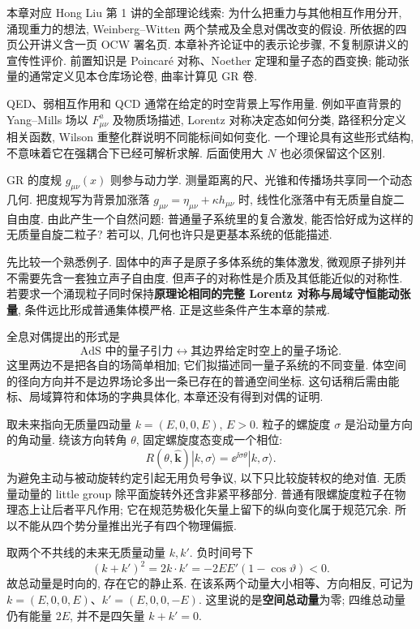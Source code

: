 \label{ch:holo-emergence-full}
本章对应 Hong Liu 第 1 讲的全部理论线索: 为什么把重力与其他相互作用分开, 涌现重力的想法, Weinberg--Witten 两个禁戒及全息对偶改变的假设. 所依据的四页公开讲义含一页 OCW 署名页. 本章补齐论证中的表示论步骤, 不复制原讲义的宣传性评价. 前置知识是 Poincaré 对称、Noether 定理和量子态的酉变换; 能动张量的通常定义见本仓库场论卷, 曲率计算见 GR 卷.

QED、弱相互作用和 QCD 通常在给定的时空背景上写作用量. 例如平直背景的 Yang--Mills 场以 $F^a_{\mu\nu}$ 及物质场描述, Lorentz 对称决定态如何分类, 路径积分定义相关函数, Wilson 重整化群说明不同能标间如何变化. 一个理论具有这些形式结构, 不意味着它在强耦合下已经可解析求解. 后面使用大 $N$ 也必须保留这个区别.

GR 的度规 $g_{\mu\nu}(x)$ 则参与动力学. 测量距离的尺、光锥和传播场共享同一个动态几何. 把度规写为背景加涨落 $g_{\mu\nu}=\eta_{\mu\nu}+\kappa h_{\mu\nu}$ 时, 线性化涨落中有无质量自旋二自由度. 由此产生一个自然问题: 普通量子系统里的复合激发, 能否恰好成为这样的无质量自旋二粒子? 若可以, 几何也许只是更基本系统的低能描述.

先比较一个熟悉例子. 固体中的声子是原子多体系统的集体激发, 微观原子排列并不需要先含一套独立声子自由度. 但声子的对称性是介质及其低能近似的对称性. 若要求一个涌现粒子同时保持\textbf{原理论相同的完整 Lorentz 对称与局域守恒能动张量}, 条件远比形成普通集体模严格. 正是这些条件产生本章的禁戒.

全息对偶提出的形式是
\[
\text{AdS 中的量子引力}
\longleftrightarrow
\text{其边界给定时空上的量子场论}.
\]
这里两边不是把各自的场简单相加; 它们拟描述同一量子系统的不同变量. 体空间的径向方向并不是边界场论多出一条已存在的普通空间坐标. 这句话稍后需由能标、局域算符和体场的字典具体化, 本章还没有得到对偶的证明.

取未来指向无质量四动量 $k=(E,0,0,E)$, $E>0$. 粒子的螺旋度 $\sigma$ 是沿动量方向的角动量. 绕该方向转角 $\theta$, 固定螺旋度态变成一个相位:
\[
R(\theta,\widehat{\mathbf k})|k,\sigma\rangle
=\ee^{\ii\sigma\theta}|k,\sigma\rangle.
\]
为避免主动与被动旋转约定引起无用负号争议, 以下只比较旋转权的绝对值. 无质量动量的 little group 除平面旋转外还含非紧平移部分. 普通有限螺旋度粒子在物理态上让后者平凡作用; 它在规范势极化矢量上留下的纵向变化属于规范冗余. 所以不能从四个势分量推出光子有四个物理偏振.

取两个不共线的未来无质量动量 $k,k'$. 负时间号下
\[
(k+k')^2=2k\cdot k'=-2EE'(1-\cos\vartheta)<0.
\]
故总动量是时向的, 存在它的静止系. 在该系两个动量大小相等、方向相反, 可记为 $k=(E,0,0,E)$、$k'=(E,0,0,-E)$. 这里说的是\textbf{空间总动量}为零; 四维总动量仍有能量 $2E$, 并不是四矢量 $k+k'=0$.

